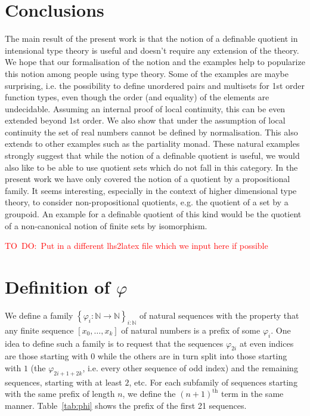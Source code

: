 \documentclass[envcountsame]{llncs}
\newcommand{\todo}[1]{\textcolor{red}{TO~DO:~#1}}
\newcommand{\N}{\mathbb{N}}
\providecommand{\set}  [1]{\left\{#1\right\}}
\begin{document}
\section{Conclusions}
\label{sec:conclusions}

The main result of the present work is that the notion of a definable
quotient in intensional type theory is useful and doesn't require any
extension of the theory. We hope that our formalisation of the notion
and the examples help to popularize this notion among people using
type theory. Some of the examples are maybe surprising, i.e. the
possibility to define unordered pairs and multisets for 1st order
function types, even though the order (and equality) of the elements
are undecidable. Assuming an internal proof of local continuity, this
can be even extended beyond 1st order. We also show that under the
assumption of local continuity the set of real numbers cannot be
defined by normalisation. This also extends to other examples such as
the partiality monad. These natural examples strongly suggest that
while the notion of a definable quotient is useful, we would also like
to be able to use quotient sets which do not fall in this category.
In the present work we have only covered the notion of a quotient by a
propositional family. It seems interesting, especially in the
context of higher dimensional type theory, to consider
non-propositional quotients, e.g. the quotient of a set by a
groupoid. An example for a definable quotient of this kind would be
the quotient of a non-canonical notion of finite sets by isomorphism.




\appendix

\todo{Put in a different lhs2latex file which we input here if possible}
\section{Definition of $\varphi$}
We define a family $\set{\varphi_i:\N\to\N}_{i:\N}$ of natural sequences with the property that any finite sequence $[x_0,\dots,x_k]$ of natural numbers is a prefix of some $\varphi_i$. One idea to define such a family is to request that the sequences $\varphi_{2i}$ at even indices are those starting with $0$ while the others are in turn split into  those starting with $1$ (the $\varphi_{2i+1+2k}$, i.e. every other sequence of odd index) and the remaining sequences, starting with at least $2$, etc. For each subfamily of sequences starting with the same prefix of length $n$, we define the $(n+1)^{\text{th}}$ term in the same manner.
Table~\ref{tab:phi} shows the prefix of the first 21 sequences.
\end{document}
